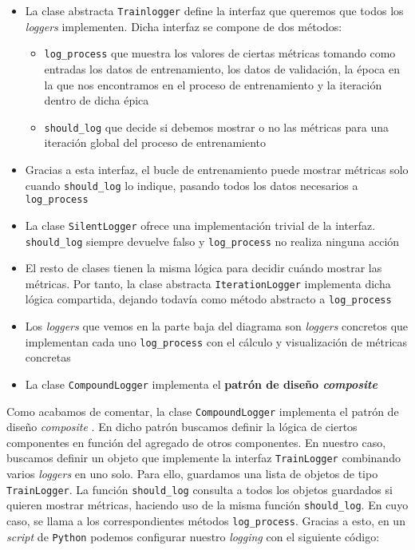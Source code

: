 \begin{itemize}
    \item La clase abstracta \lstinline{Trainlogger} define la interfaz que queremos que todos los \textit{loggers} implementen. Dicha interfaz se compone de dos métodos:
        \begin{itemize}
            \item \lstinline{log_process} que muestra los valores de ciertas métricas tomando como entradas los datos de entrenamiento, los datos de validación, la época en la que nos encontramos en el proceso de entrenamiento y la iteración dentro de dicha épica
            \item \lstinline{should_log} que decide si debemos mostrar o no las métricas para una iteración global del proceso de entrenamiento
        \end{itemize}
    \item Gracias a esta interfaz, el bucle de entrenamiento puede mostrar métricas solo cuando \lstinline{should_log} lo indique, pasando todos los datos necesarios a \lstinline{log_process}
    \item La clase \lstinline{SilentLogger} ofrece una implementación trivial de la interfaz. \lstinline{should_log} siempre devuelve falso y \lstinline{log_process} no realiza ninguna acción
    \item El resto de clases tienen la misma lógica para decidir cuándo mostrar las métricas. Por tanto, la clase abstracta \lstinline{IterationLogger} implementa dicha lógica compartida, dejando todavía como método abstracto a \lstinline{log_process}
    \item Los \textit{loggers} que vemos en la parte baja del diagrama son \textit{loggers} concretos que implementan cada uno \lstinline{log_process} con el cálculo y visualización de métricas concretas
    \item La clase \lstinline{CompoundLogger} implementa el \textbf{patrón de diseño \textit{composite}}
\end{itemize}

Como acabamos de comentar, la clase \lstinline{CompoundLogger} implementa el patrón de diseño \textit{composite} \cite{informatica:design_patterns}. En dicho patrón buscamos definir la lógica de ciertos componentes en función del agregado de otros componentes. En nuestro caso, buscamos definir un objeto que implemente la interfaz \lstinline{TrainLogger} combinando varios \textit{loggers} en uno solo. Para ello, guardamos una lista de objetos de tipo \lstinline{TrainLogger}. La función \lstinline{should_log} consulta a todos los objetos guardados si quieren mostrar métricas, haciendo uso de la misma función \lstinline{should_log}. En cuyo caso, se llama a los correspondientes métodos \lstinline{log_process}. Gracias a esto, en un \textit{script} de \lstinline{Python} podemos configurar nuestro \textit{logging} con el siguiente código:

